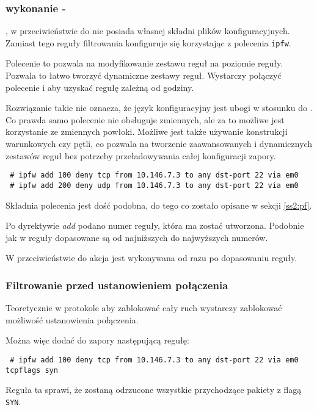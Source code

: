 \subsubsection{wykonanie - \ipfw{}}
\label{ss2:ipfw}
\ipfw{}, w przeciwieństwie do \pf{} nie posiada własnej składni plików konfiguracyjnych.
Zamiast tego reguły filtrowania konfiguruje się korzystając z polecenia \texttt{ipfw}.

Polecenie to pozwala na modyfikowanie zestawu reguł na poziomie reguły.
Pozwala to łatwo tworzyć dynamiczne zestawy reguł.
Wystarczy połączyć polecenie \ipfw{} i \cron{} aby uzyskać regułę zależną od godziny.

Rozwiązanie takie nie oznacza, że język konfiguracyjny jest ubogi w stosunku do \pf{}.
Co prawda samo polecenie \ipfw{} nie obsługuje zmiennych, ale za to możliwe jest korzystanie ze zmiennych powłoki.
Możliwe jest także używanie konstrukcji warunkowych czy pętli, co pozwala na tworzenie zaawansowanych i dynamicznych zestawów reguł bez potrzeby przeładowywania całej konfiguracji zapory.

\begin{lstlisting}
 # ipfw add 100 deny tcp from 10.146.7.3 to any dst-port 22 via em0
 # ipfw add 200 deny udp from 10.146.7.3 to any dst-port 22 via em0
\end{lstlisting}

Składnia polecenia jest dość podobna, do tego co zostało opisane w sekcji \ref{ss2:pf}.

Po dyrektywie \emph{add} podano numer reguły, która ma zostać utworzona.
Podobnie jak w \pf{} reguły dopasowane są od najniższych do najwyższych numerów.

W przeciwieństwie do \pf{} akcja jest wykonywana od razu po dopasowaniu reguły.

\subsubsection{Filtrowanie przed ustanowieniem połączenia}
Teoretycznie w protokole \tcp{} aby zablokować cały ruch wystarczy zablokować możliwość ustanowienia połączenia.

Można więc dodać do zapory następującą regułę:
\begin{lstlisting}
 # ipfw add 100 deny tcp from 10.146.7.3 to any dst-port 22 via em0 tcpflags syn
\end{lstlisting}

Reguła ta sprawi, że zostaną odrzucone wszystkie przychodzące pakiety z flagą \texttt{SYN}.

